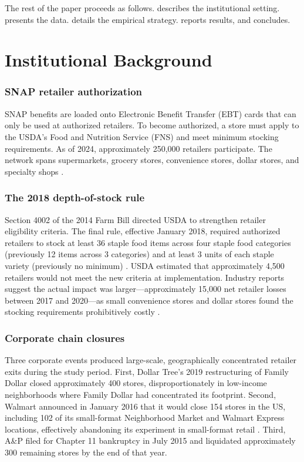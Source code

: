 \documentclass[12pt]{article}
\begin{document}
The rest of the paper proceeds as follows.  describes the institutional setting.  presents the data.  details the empirical strategy.  reports results, and  concludes.


\section{Institutional Background}
\label{sec:background}

\subsubsection*{SNAP retailer authorization} SNAP benefits are loaded onto Electronic Benefit Transfer (EBT) cards that can only be used at authorized retailers. To become authorized, a store must apply to the USDA's Food and Nutrition Service (FNS) and meet minimum stocking requirements. As of 2024, approximately 250,000 retailers participate. The network spans supermarkets, grocery stores, convenience stores, dollar stores, and specialty shops \citep{hoynes2016}.

\subsubsection*{The 2018 depth-of-stock rule} Section 4002 of the 2014 Farm Bill directed USDA to strengthen retailer eligibility criteria. The final rule, effective January 2018, required authorized retailers to stock at least 36 staple food items across four staple food categories (previously 12 items across 3 categories) and at least 3 units of each staple variety (previously no minimum) \citep{fns2018}. USDA estimated that approximately 4,500 retailers would not meet the new criteria at implementation. Industry reports suggest the actual impact was larger---approximately 15,000 net retailer losses between 2017 and 2020---as small convenience stores and dollar stores found the stocking requirements prohibitively costly \citep{usda2023}.

\subsubsection*{Corporate chain closures} Three corporate events produced large-scale, geographically concentrated retailer exits during the study period. First, Dollar Tree's 2019 restructuring of Family Dollar closed approximately 400 stores, disproportionately in low-income neighborhoods where Family Dollar had concentrated its footprint. Second, Walmart announced in January 2016 that it would close 154 stores in the US, including 102 of its small-format Neighborhood Market and Walmart Express locations, effectively abandoning its experiment in small-format retail \citep{neumark2010, basker2005}. Third, A\&P filed for Chapter 11 bankruptcy in July 2015 and liquidated approximately 300 remaining stores by the end of that year.
\end{document}
